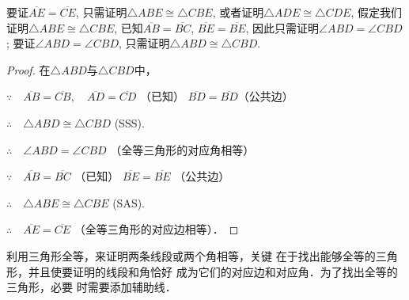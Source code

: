 \begin{analyze}
    要证$\overline{AE}=\overline{CE}$, 只需证明$\triangle ABE\cong \triangle CBE$, 或者证明$\triangle ADE\cong \triangle CDE$, 假定我们证明$\triangle ABE\cong \triangle CBE$,
    已知$\overline{AB}=\overline{BC}$, $\overline{BE}=\overline{BE}$, 因此只需证明$\angle ABD=\angle CBD$;
    要证$\angle ABD=\angle CBD$, 只需证明$\triangle ABD\cong\triangle CBD$.
\end{analyze}

\begin{proof}
    在$\triangle ABD$与$\triangle CBD$中，

    $\because\quad \overline{AB}=\overline{CB},\quad \overline{AD}=\overline{CD}$ （已知）   $\overline{BD}=\overline{BD}$（公共边）

    $\therefore\quad \triangle ABD\cong \triangle CBD$ (SSS).

    $\therefore\quad \angle ABD=\angle CBD$ （全等三角形的对应角相等）

$\because\quad     \overline{AB}=\overline{BC}$ （已知） 
    $\overline{BE}=\overline{BE}$ （公共边）

$\therefore\quad \triangle ABE\cong \triangle CBE$ (SAS).

$\therefore\quad \overline{AE}=\overline{CE}$ （全等三角形的对应边相等）．
\end{proof}

    利用三角形全等，来证明两条线段或两个角相等，关键
    在于找出能够全等的三角形，并且使要证明的线段和角恰好
    成为它们的对应边和对应角．为了找出全等的三角形，必要
    时需要添加辅助线．  

